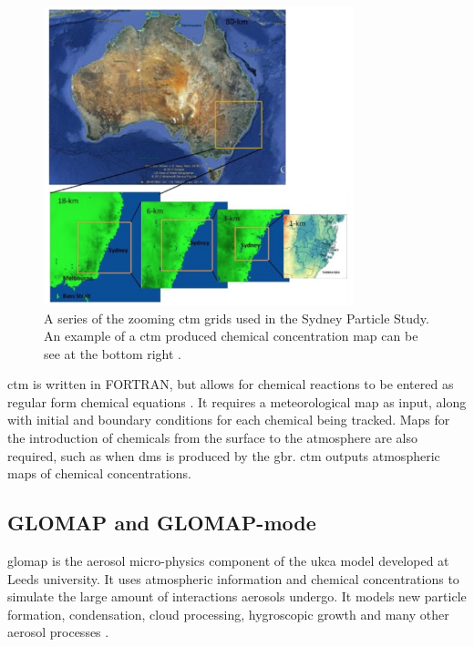 		\begin{figure}[!htb]
	    	\centering
	    	\includegraphics[width=0.8\textwidth,natwidth=1308,natheight=952]{Fig/ctmexample.png}
	    	\caption{A series of the zooming \gls{ctm} grids used in the Sydney Particle Study. An example of a \gls{ctm} produced chemical concentration map can be see at the bottom right \citep{cope:2014tw}.}
	    	\label{fig:sydpartgrid}
		\end{figure}

		\gls{ctm} is written in FORTRAN, but allows for chemical reactions to be entered as regular form chemical equations \citep{cope:2009tz}. It requires a meteorological map as input, along with initial and boundary conditions for each chemical being tracked. Maps for the introduction of chemicals from the surface to the atmosphere are also required, such as when \gls{dms} is produced by the \gls{gbr}. \gls{ctm} outputs atmospheric maps of chemical concentrations.


		\subsection{GLOMAP and GLOMAP-mode}
		\label{subsec:glomap}

		\gls{glomap} is the aerosol micro-physics component of the \gls{ukca} model developed at Leeds university. It uses atmospheric information and chemical concentrations to simulate the large amount of interactions aerosols undergo. It models new particle formation, condensation, cloud processing, hygroscopic growth and many other aerosol processes \citep{mann:2010wb}.


